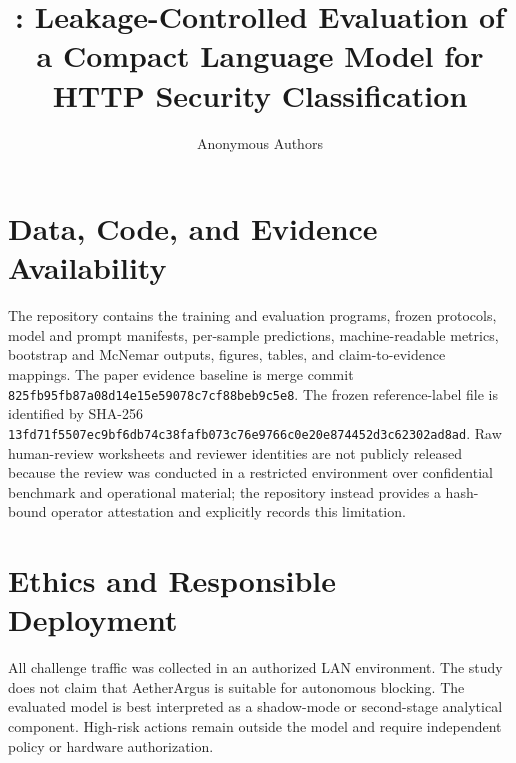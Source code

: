 \documentclass[10pt,journal,compsoc]{IEEEtran}
\title{\model: Leakage-Controlled Evaluation of a Compact Language Model for HTTP Security Classification}
\author{Anonymous Authors}
\newcommand{\model}{AetherArgus}
\newcommand{\commitid}{\texttt{825fb95fb87a08d14e15e59078c7cf88beb9c5e8}}
\newcommand{\labelhash}{\texttt{13fd71f5507ec9bf6db74c38fafb073c76e9766c0e20e874452d3c62302ad8ad}}
\begin{document}
\maketitle










\section*{Data, Code, and Evidence Availability}
The repository contains the training and evaluation programs, frozen protocols, model and prompt manifests, per-sample predictions, machine-readable metrics, bootstrap and McNemar outputs, figures, tables, and claim-to-evidence mappings. The paper evidence baseline is merge commit \commitid. The frozen reference-label file is identified by SHA-256 \labelhash. Raw human-review worksheets and reviewer identities are not publicly released because the review was conducted in a restricted environment over confidential benchmark and operational material; the repository instead provides a hash-bound operator attestation and explicitly records this limitation.

\section*{Ethics and Responsible Deployment}
All challenge traffic was collected in an authorized LAN environment. The study does not claim that \model{} is suitable for autonomous blocking. The evaluated model is best interpreted as a shadow-mode or second-stage analytical component. High-risk actions remain outside the model and require independent policy or hardware authorization.



\balance
\end{document}
